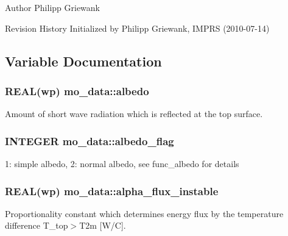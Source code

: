 \begin{DoxyAuthor}{Author}
Philipp Griewank
\end{DoxyAuthor}
\begin{DoxyParagraph}{Revision History}
Initialized by Philipp Griewank, IMPRS (2010-\/07-\/14) 
\end{DoxyParagraph}


\subsection{Variable Documentation}
\hypertarget{namespacemo__data_a4e0875d21076b42177bdff28faf75a53}{
\subsubsection[{albedo}]{\setlength{\rightskip}{0pt plus 5cm}REAL(wp) {\bf mo\_\-data::albedo}}}
\label{namespacemo__data_a4e0875d21076b42177bdff28faf75a53}


Amount of short wave radiation which is reflected at the top surface. 

\hypertarget{namespacemo__data_a503f12cf2d0684ad5423b92e37c97fbe}{
\subsubsection[{albedo\_\-flag}]{\setlength{\rightskip}{0pt plus 5cm}INTEGER {\bf mo\_\-data::albedo\_\-flag}}}
\label{namespacemo__data_a503f12cf2d0684ad5423b92e37c97fbe}


1: simple albedo, 2: normal albedo, see func\_\-albedo for details 

\hypertarget{namespacemo__data_a14ac53f7afeb8965106ee70871b38006}{
\subsubsection[{alpha\_\-flux\_\-instable}]{\setlength{\rightskip}{0pt plus 5cm}REAL(wp) {\bf mo\_\-data::alpha\_\-flux\_\-instable}}}
\label{namespacemo__data_a14ac53f7afeb8965106ee70871b38006}


Proportionality constant which determines energy flux by the temperature difference T\_\-top$>$T2m \mbox{[}W/C\mbox{]}. 

